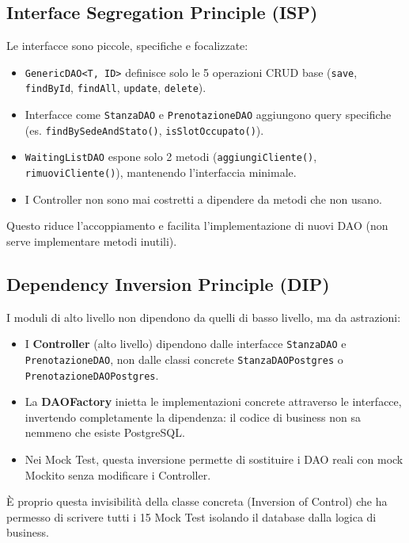 \subsection{Interface Segregation Principle (ISP)}
Le interfacce sono piccole, specifiche e focalizzate:

\begin{itemize}
    \item \texttt{GenericDAO<T, ID>} definisce solo le 5 operazioni CRUD base (\texttt{save}, \texttt{findById}, \texttt{findAll}, \texttt{update}, \texttt{delete}).
    \item Interfacce come \texttt{StanzaDAO} e \texttt{PrenotazioneDAO} aggiungono query specifiche (es. \texttt{findBySede\allowbreak AndStato()}, \texttt{isSlot\allowbreak Occupato()}).
    \item \texttt{WaitingListDAO} espone solo 2 metodi (\texttt{aggiungiCliente()}, \texttt{rimuoviCliente()}), mantenendo l'interfaccia minimale.
    \item I Controller non sono mai costretti a dipendere da metodi che non usano.
\end{itemize}

Questo riduce l'accoppiamento e facilita l'implementazione di nuovi DAO (non serve implementare metodi inutili).

\subsection{Dependency Inversion Principle (DIP)}
I moduli di alto livello non dipendono da quelli di basso livello, ma da astrazioni:

\begin{itemize}
    \item I \textbf{Controller} (alto livello) dipendono dalle interfacce \texttt{StanzaDAO} e \texttt{PrenotazioneDAO}, non dalle classi concrete \texttt{StanzaDAOPostgres} o \texttt{PrenotazioneDAOPostgres}.
    \item La \textbf{DAOFactory} inietta le implementazioni concrete attraverso le interfacce, invertendo completamente la dipendenza: il codice di business non sa nemmeno che esiste PostgreSQL.
    \item Nei Mock Test, questa inversione permette di sostituire i DAO reali con mock Mockito senza modificare i Controller.
\end{itemize}

È proprio questa invisibilità della classe concreta (Inversion of Control) che ha permesso di scrivere tutti i 15 Mock Test isolando il database dalla logica di business.

